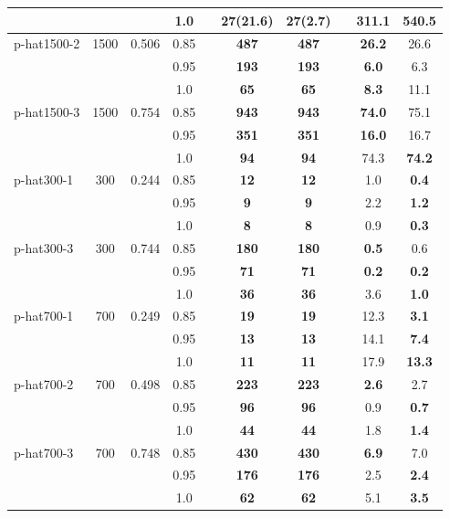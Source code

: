\begin{table}[h!]
\begin{tabular}{l c c c c c c c c c}
& & & 1.0 & & \textbf{27(21.6)} & 27(2.7) & & 311.1 & 540.5 \\
\midrule
p-hat1500-2 & 1500 & 0.506 & 0.85 & & \textbf{487} & \textbf{487} & & \textbf{26.2} & 26.6 \\
& & & 0.95 & & \textbf{193} & \textbf{193} & & \textbf{6.0} & 6.3 \\
& & & 1.0 & & \textbf{65} & \textbf{65} & & \textbf{8.3} & 11.1 \\
\midrule
p-hat1500-3 & 1500 & 0.754 & 0.85 & & \textbf{943} & \textbf{943} & & \textbf{74.0} & 75.1 \\
& & & 0.95 & & \textbf{351} & \textbf{351} & & \textbf{16.0} & 16.7 \\
& & & 1.0 & & \textbf{94} & \textbf{94} & & 74.3 & \textbf{74.2} \\
\midrule
p-hat300-1 & 300 & 0.244 & 0.85 & & \textbf{12} & \textbf{12} & & 1.0 & \textbf{0.4} \\
& & & 0.95 & & \textbf{9} & \textbf{9} & & 2.2 & \textbf{1.2} \\
& & & 1.0 & & \textbf{8} & \textbf{8} & & 0.9 & \textbf{0.3} \\
\midrule
p-hat300-3 & 300 & 0.744 & 0.85 & & \textbf{180} & \textbf{180} & & \textbf{0.5} & 0.6 \\
& & & 0.95 & & \textbf{71} & \textbf{71} & & \textbf{0.2} & \textbf{0.2} \\
& & & 1.0 & & \textbf{36} & \textbf{36} & & 3.6 & \textbf{1.0} \\
\midrule
p-hat700-1 & 700 & 0.249 & 0.85 & & \textbf{19} & \textbf{19} & & 12.3 & \textbf{3.1} \\
& & & 0.95 & & \textbf{13} & \textbf{13} & & 14.1 & \textbf{7.4} \\
& & & 1.0 & & \textbf{11} & \textbf{11} & & 17.9 & \textbf{13.3} \\
\midrule
p-hat700-2 & 700 & 0.498 & 0.85 & & \textbf{223} & \textbf{223} & & \textbf{2.6} & 2.7 \\
& & & 0.95 & & \textbf{96} & \textbf{96} & & 0.9 & \textbf{0.7} \\
& & & 1.0 & & \textbf{44} & \textbf{44} & & 1.8 & \textbf{1.4} \\
\midrule
p-hat700-3 & 700 & 0.748 & 0.85 & & \textbf{430} & \textbf{430} & & \textbf{6.9} & 7.0 \\
& & & 0.95 & & \textbf{176} & \textbf{176} & & 2.5 & \textbf{2.4} \\
& & & 1.0 & & \textbf{62} & \textbf{62} & & 5.1 & \textbf{3.5} \\

    \bottomrule
    \bottomrule
    \end{tabular}
    \end{table}